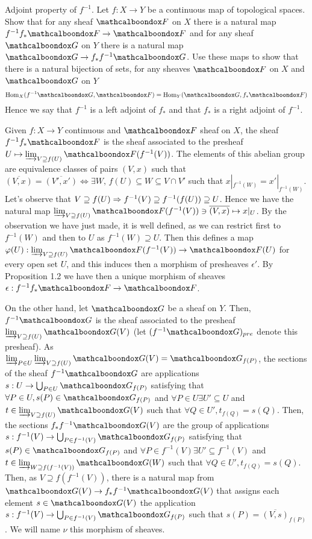 \begin{ex}
	Adjoint property of $f^{-1}$. Let $f: X \to Y$ be a continuous map of topological spaces. Show that for any sheaf $\sF$ on $X$ there is a natural map $f^{-1}f_{*}\sF \to \sF$ and for any sheaf $\sG$ on $Y$ there is a natural map $\sG \to f_{*}f^{-1}\sG$. Use these maps to show that there is a natural bijection of sets, for any sheaves $\sF$ on $X$ and $\sG$ on $Y$
	\[
		\mathrm{Hom}_X(f^{-1}\sG, \sF) = \mathrm{Hom}_Y(\sG, f_{*}\sF)
	\]
	Hence we say that $f^{-1}$ is a left adjoint of $f_{*}$ and that $f_{*}$ is a right adjoint of $f^{-1}$.
\end{ex}

\begin{sol}
	Given $f:X \to Y$ continuous and $\sF$ sheaf on $X$, the sheaf $f^{-1}f_{*}\sF$ is the sheaf associated to the presheaf $U \mapsto \varinjlim_{V \supseteq f(U)} \sF(f^{-1}(V))$. The elements of this abelian group are equivalence classes of pairs $(V,x)$ such that $\overline{(V,x)} = \overline{(V',x')} \iff \exists W, \, f(U) \subseteq W \subseteq V \cap V'$ such that $x|_{f^{-1}(W)} = x'|_{f^{-1}(W)}$. Let's observe that $V \supseteq f(U) \Rightarrow f^{-1}(V) \supseteq f^{-1}(f(U)) \supseteq U$. Hence we have the natural map $\varinjlim_{V \supseteq f(U)} \sF(f^{-1}(V)) \ni \overline{(V,x)} \mapsto x|_U$. By the observation we have just made, it is well defined, as we can restrict first to $f^{-1}(W)$ and then to $U$ as $f^{-1}(W) \supseteq U$. Then this defines a map $\varphi(U): \varinjlim_{V \supseteq f(U)} \sF(f^{-1}(V)) \to \sF(U)$ for every open set $U$, and this induces then a morphism of presheaves $\epsilon'$. By Proposition 1.2 we have then a unique morphism of sheaves $\epsilon: f^{-1}f_{*}\sF \to \sF$.

	On the other hand, let $\sG$ be a sheaf on $Y$. Then, $f^{-1}\sG$ is the sheaf associated to the presheaf $\varinjlim_{V \supseteq f(U)} \sG(V)$ (let $(f^{-1}\sG)_{pre}$ denote this presheaf). As $\varinjlim_{P \in U} \varinjlim_{V \supseteq f(U)} \sG(V) = \sG_{f(P)}$, the sections of the sheaf $f^{-1}\sG$ are applications $s: U \to \bigcup_{P \in U} \sG_{f(P)}$ satisfying that $\forall P \in U, s(P) \in \sG_{f(P)}$ and $\forall P \in U \exists U' \subseteq U$ and $t \in \varinjlim_{V \supseteq f(U)} \sG(V)$ such that $\forall Q \in U', t_{f(Q)} = s(Q)$. Then, the sections $f_{*}f^{-1}\sG(V)$ are the group of applications $s: f^{-1}(V) \to \bigcup_{P \in f^{-1}(V)} \sG_{f(P)}$ satisfying that $s(P) \in \sG_{f(P)}$ and $\forall P \in f^{-1}(V) \exists U' \subseteq f^{-1}(V)$ and $t \in \varinjlim_{W \supseteq f(f^{-1}(V))} \sG(W)$ such that $\forall Q \in U', t_{f(Q)} = s(Q)$. Then, as $V \supseteq f(f^{-1}(V))$, there is a natural map from $\sG(V) \to f_{*}f^{-1}\sG(V)$ that assigns each element $s \in \sG(V)$ the application $s: f^{-1}(V) \to \bigcup_{P \in f^{-1}(V)} \sG_{f(P)}$ such that $s(P) = \overline{(V,s)}_{f(P)}$. We will name $\nu$ this morphism of sheaves.


\end{sol}
